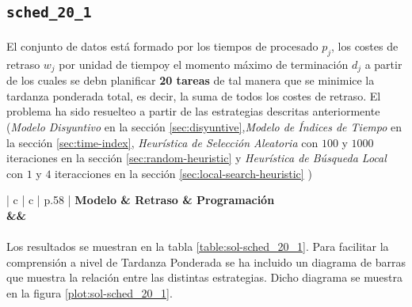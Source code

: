 \documentclass[spanish]{article}
\begin{document}
		\subsection{\texttt{sched\_20\_1}}

			\paragraph{}
			El conjunto de datos está formado por los tiempos de procesado $p_j$, los costes de retraso $w_j$ por unidad de tiempoy el momento máximo de terminación $d_j$ a partir de los cuales se debn planificar \textbf{20 tareas} de tal manera que se minimice la tardanza ponderada total, es decir, la suma de todos los costes de retraso. El problema ha sido resuelteo a partir de las estrategias descritas anteriormente (\emph{Modelo Disyuntivo} en la sección \ref{sec:disyuntive},\emph{Modelo de Índices de Tiempo} en la sección \ref{sec:time-index}, \emph{Heurística de Selección Aleatoria} con $100$ y $1000$ iteraciones en la sección \ref{sec:random-heuristic} y \emph{Heurística de Búsqueda Local} con $1$ y $4$ iteracciones en la sección \ref{sec:local-search-heuristic} )


			\begin{table}
				\centering
				\begin{tabu}{ | c | c | p{.58\linewidth} |}
					\hline
					\bfseries Modelo & \bfseries Retraso & \bfseries Programación
					{\\\hline\model&\delay&\schedule}
					\\\hline
				\end{tabu}
				\caption{Resultados Obtenidos para el problema \texttt{sched\_20\_1}}
				\label{table:sol-sched_20_1}
			\end{table}

			\paragraph{}
			Los resultados se muestran en la tabla \ref{table:sol-sched_20_1}. Para facilitar la comprensión a nivel de Tardanza Ponderada se ha incluido un diagrama de barras que muestra la relación entre las distintas estrategias. Dicho diagrama se muestra en la figura \ref{plot:sol-sched_20_1}.
\end{document}

